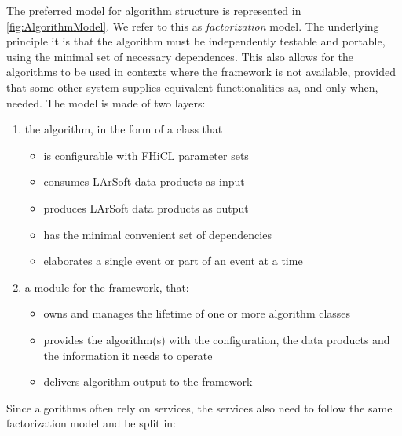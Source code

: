 The preferred model for algorithm structure is represented in \cref{fig:AlgorithmModel}.
We refer to this as \emph{factorization} model.
The underlying principle it is that the algorithm must be independently
testable and portable, using the minimal set of necessary dependences.
This also allows for the algorithms to be used in contexts where the
\ART framework is not available,
provided that some other system supplies equivalent functionalities as,
and only when, needed. The model is made of two layers:
\begin{enumerate}
   \item
      the algorithm, in the form of a class that
      \begin{itemize}
         \item
            is configurable with FHiCL parameter sets
         \item
            consumes LArSoft data products as input
         \item
            produces LArSoft data products as output
         \item
            has the minimal convenient set of dependencies
         \item
            elaborates a single event or part of an event at a time
      \end{itemize}
   \item
      a module for the \ART framework, that:
      \begin{itemize}
         \item
           owns and manages the lifetime of one or more algorithm classes
         \item
           provides the algorithm(s) with the configuration, the data products
           and the information it needs to operate
         \item
           delivers algorithm output to the \ART framework
      \end{itemize}
\end{enumerate}

Since algorithms often rely on services, the services also need to
follow the same factorization model and be split in:

